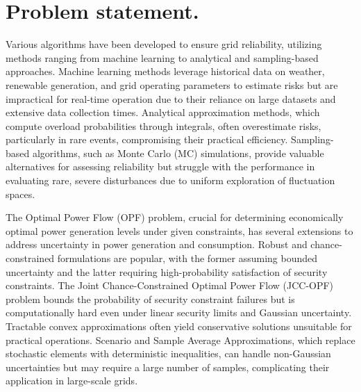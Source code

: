 \section{Problem statement.}
Various algorithms have been developed to ensure grid reliability, utilizing methods ranging from machine learning to analytical and sampling-based approaches. Machine learning methods leverage historical data on weather, renewable generation, and grid operating parameters to estimate risks but are impractical for real-time operation due to their reliance on large datasets and extensive data collection times. Analytical approximation methods, which compute overload probabilities through integrals, often overestimate risks, particularly in rare events, compromising their practical efficiency. Sampling-based algorithms, such as Monte Carlo (MC) simulations, provide valuable alternatives for assessing reliability but struggle with the performance in evaluating rare, severe disturbances due to uniform exploration of fluctuation spaces.

The Optimal Power Flow (OPF) problem, crucial for determining economically optimal power generation levels under given constraints, has several extensions to address uncertainty in power generation and consumption. Robust and chance-constrained formulations are popular, with the former assuming bounded uncertainty and the latter requiring high-probability satisfaction of security constraints. The Joint Chance-Constrained Optimal Power Flow (JCC-OPF) problem bounds the probability of security constraint failures but is computationally hard even under linear security limits and Gaussian uncertainty. Tractable convex approximations often yield conservative solutions unsuitable for practical operations. Scenario and Sample Average Approximations, which replace stochastic elements with deterministic inequalities, can handle non-Gaussian uncertainties but may require a large number of samples, complicating their application in large-scale grids.

